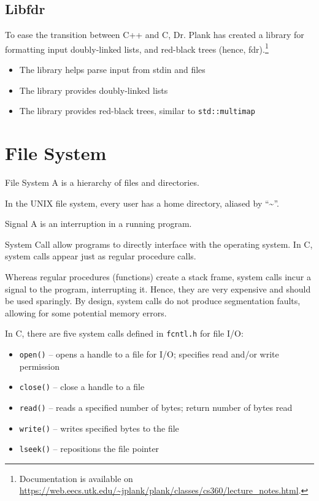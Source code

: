 \documentclass[12pt]{report}
\begin{document}
\section{Libfdr}
To ease the transition between C++ and C, Dr. Plank has created a library for formatting input doubly-linked lists, and red-black trees (hence, fdr).\footnote{Documentation is available on \url{https://web.eecs.utk.edu/\~jplank/plank/classes/cs360/lecture_notes.html}.}
\begin{itemize}
    \item The  library helps parse input from stdin and files
    \item The  library provides doubly-linked lists
    \item The  library provides red-black trees, similar to \texttt{std::multimap}
\end{itemize}

\chapter{File System}

\begin{dfnbox}{File System}{}
    A  is a hierarchy of files and directories.
\end{dfnbox}

In the UNIX file system, every user has a home directory, aliased by ``\textasciitilde''.

\begin{dfnbox}{Signal}{}
    A  is an interruption in a running program.
\end{dfnbox}

\begin{dfnbox}{System Call}{}
     allow programs to directly interface with the operating system. In C, system calls appear just as regular procedure calls.
\end{dfnbox}

Whereas regular procedures (functions) create a stack frame, system calls incur a signal to the program, interrupting it. Hence, they are very expensive and should be used sparingly. By design, system calls do not produce segmentation faults, allowing for some potential memory errors.

In C, there are five system calls defined in \texttt{fcntl.h} for file I/O:
\begin{itemize}[noitemsep]
    \item \texttt{open()} -- opens a handle to a file for I/O; specifies read and/or write permission
    \item \texttt{close()} -- close a handle to a file
    \item \texttt{read()} -- reads a specified number of bytes; return number of bytes read
    \item \texttt{write()} -- writes specified bytes to the file
    \item \texttt{lseek()} -- repositions the file pointer
\end{itemize}
\end{document}
